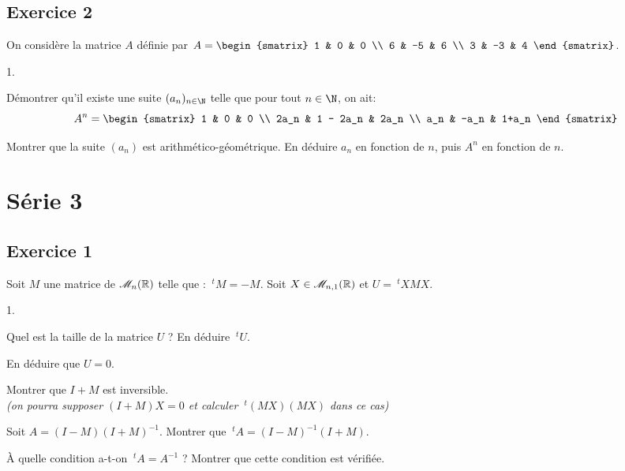 \documentclass[11pt]{article}%
\begin{document}
\subsection*{Exercice 2}
\noindent
On considère la matrice $A$ définie par $A = 
\begin{smatrix} 1 & 0 & 0 \\ 6 & -5 & 6 \\ 3 & -3 & 4 \end{smatrix}$.
\begin{noliste}{1.}
\item Démontrer qu'il existe une suite $(a_n)_{n \in \N}$ telle que 
pour tout $n \in \N$, on ait:
\[
A^n = \begin{smatrix} 1 & 0 & 0 \\ 2a_n & 1 - 2a_n & 2a_n \\ a_n & 
-a_n & 1+a_n \end{smatrix}
\]
\item Montrer que la suite $(a_n)$ est arithmético-géométrique. En 
déduire $a_n$ en fonction de $n$, puis $A^n$ en fonction de $n$.
\end{noliste}

\newpage

\section{Série 3}

\subsection*{Exercice 1}
\noindent
Soit $M$ une matrice de $\mathscr{M}_{n}(\mathbb{R})$ telle que : $~^tM = -M$. Soit $X 
\in\mathscr{M}_{n,1}(\mathbb{R})$ et $U = ~^tXMX$.
  \begin{noliste}{1.}
  \item Quel est la taille de la matrice $U$ ? En déduire $~^tU$.
  \item En déduire que $U = 0$.
  \item Montrer que $I+M$ est inversible.\\
    \emph{(on pourra supposer $(I+M)X = 0$ et calculer $~^t(MX)(MX)$
      dans ce cas)}
  \item Soit $A = (I-M)(I+M)^{-1}$. Montrer que $~^tA =
    (I-M)^{-1}(I+M)$.
  \item À quelle condition a-t-on $~^tA = A^{-1}$ ? Montrer que cette
    condition est vérifiée.
  \end{noliste}
\end{document}
